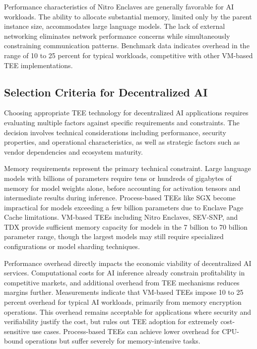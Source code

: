Performance characteristics of Nitro Enclaves are generally favorable for AI workloads. The ability to allocate substantial memory, limited only by the parent instance size, accommodates large language models. The lack of external networking eliminates network performance concerns while simultaneously constraining communication patterns. Benchmark data indicates overhead in the range of 10 to 25 percent for typical workloads, competitive with other VM-based TEE implementations.

\subsection{Selection Criteria for Decentralized AI}

Choosing appropriate TEE technology for decentralized AI applications requires evaluating multiple factors against specific requirements and constraints. The decision involves technical considerations including performance, security properties, and operational characteristics, as well as strategic factors such as vendor dependencies and ecosystem maturity.

Memory requirements represent the primary technical constraint. Large language models with billions of parameters require tens or hundreds of gigabytes of memory for model weights alone, before accounting for activation tensors and intermediate results during inference. Process-based TEEs like SGX become impractical for models exceeding a few billion parameters due to Enclave Page Cache limitations. VM-based TEEs including Nitro Enclaves, SEV-SNP, and TDX provide sufficient memory capacity for models in the 7 billion to 70 billion parameter range, though the largest models may still require specialized configurations or model sharding techniques.

Performance overhead directly impacts the economic viability of decentralized AI services. Computational costs for AI inference already constrain profitability in competitive markets, and additional overhead from TEE mechanisms reduces margins further. Measurements indicate that VM-based TEEs impose 10 to 25 percent overhead for typical AI workloads, primarily from memory encryption operations. This overhead remains acceptable for applications where security and verifiability justify the cost, but rules out TEE adoption for extremely cost-sensitive use cases. Process-based TEEs can achieve lower overhead for CPU-bound operations but suffer severely for memory-intensive tasks.

